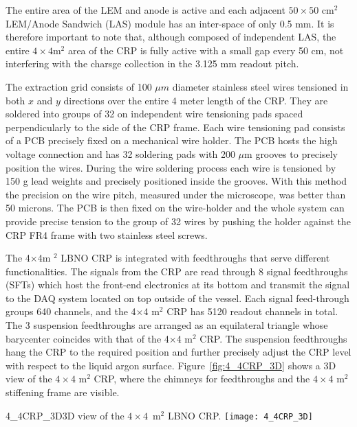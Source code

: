 The entire area of the LEM and anode is active and each adjacent $50\times50$ cm$^2$ LEM/Anode Sandwich (LAS) module has an inter-space of only 0.5 mm. It is therefore important  to note that, although composed of independent LAS, the  entire $4\times 4$m$^2$ area of the CRP is fully active with a small gap every 50 cm, not interfering with the charsge collection in the 3.125 mm readout pitch.

The extraction grid consists of 100 $\mu$$m$ diameter stainless steel  wires tensioned in both $x$ and $y$ directions over the entire 4 meter  length of the CRP. They are soldered into groups of 32 on independent  wire tensioning pads spaced perpendicularly to the side of the CRP frame. Each wire  tensioning pad consists of a PCB precisely fixed on a mechanical wire  holder. The PCB hosts the high voltage connection and has 32 soldering pads with 200 $\mu$m grooves to precisely position the  wires. During the wire soldering process each wire is tensioned by 150 g lead weights and precisely positioned inside the grooves. With  this method the precision on the wire pitch, measured under the  microscope, was better than 50 microns. The PCB is then fixed on the  wire-holder and the whole system can provide precise tension to the  group of 32 wires by pushing the holder against the CRP FR4 frame  with two stainless steel screws.

The 4$\times$4m $^2$ LBNO CRP is integrated with feedthroughs that serve  different functionalities. The signals from the CRP are read  through 8 signal feedthroughs (SFTs) which host the front-end electronics at its bottom and transmit the signal to the DAQ system located on top outside of the vessel.  Each signal feed-through groups 640 channels, and the 4$\times$4 m$^2$ CRP has 5120 readout channels in total.  The 3 suspension feedthroughs are arranged as an equilateral triangle whose barycenter coincides with that of the 4$\times$4 m$^2$ CRP.  The suspension feedthroughs hang the CRP to   the required position and further precisely adjust the CRP level  with respect to the liquid argon surface. Figure~\ref{fig:4_4CRP_3D} shows a 3D view of the  $4\times4$ m$^2$ CRP, where the chimneys for feedthroughs and the  $4\times4$ m$^2$ stiffening frame are visible. 

\begin{cdrfigure}{4_4CRP_3D}{3D view of the $4\times4$~m$^2$ LBNO CRP.}
\texttt{[image: 4\_4CRP\_3D]}  
\end{cdrfigure}


